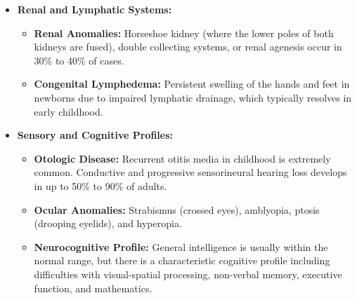 \begin{itemize}
\begin{itemize}
        \item \textbf{Gonadal Dysgenesis:} Over 90\% of females experience complete ovarian failure. Spontaneous breast development and menarche occur in only 10\% to 20\% of girls (mostly those with mosaicism), and almost all experience premature menopause. Infertility is present in over 99\% of cases.
        \item \textbf{Autoimmune Hypothyroidism:} Up to 30\% of individuals develop Hashimoto's thyroiditis, presenting with elevated thyroid-stimulating hormone (TSH) and anti-thyroid antibodies.
        \item \textbf{Metabolic Dysfunction:} Elevated risk of insulin resistance, impaired glucose tolerance, type 2 diabetes mellitus, and atherogenic dyslipidaemia.
    \end{itemize}
    \item \textbf{Renal and Lymphatic Systems:}
    \begin{itemize}
        \item \textbf{Renal Anomalies:} Horseshoe kidney (where the lower poles of both kidneys are fused), double collecting systems, or renal agenesis occur in 30\% to 40\% of cases.
        \item \textbf{Congenital Lymphedema:} Persistent swelling of the hands and feet in newborns due to impaired lymphatic drainage, which typically resolves in early childhood.
    \end{itemize}
    \item \textbf{Sensory and Cognitive Profiles:}
    \begin{itemize}
        \item \textbf{Otologic Disease:} Recurrent otitis media in childhood is extremely common. Conductive and progressive sensorineural hearing loss develops in up to 50\% to 90\% of adults.
        \item \textbf{Ocular Anomalies:} Strabismus (crossed eyes), amblyopia, ptosis (drooping eyelids), and hyperopia.
        \item \textbf{Neurocognitive Profile:} General intelligence is usually within the normal range, but there is a characteristic cognitive profile including difficulties with visual-spatial processing, non-verbal memory, executive function, and mathematics.
    \end{itemize}
\end{itemize}

